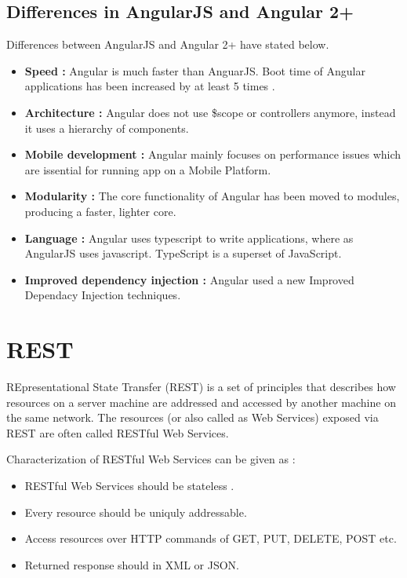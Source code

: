 \subsection{Differences in AngularJS and Angular 2+}
Differences between AngularJS and Angular  2+ have stated below.
 
\begin{itemize}
\item{\textbf{ Speed :}  Angular is much faster than AnguarJS. Boot time of Angular applications has been increased by at least 5 times \cite{faster}.}
\item{\textbf{ Architecture :} Angular does not use \$scope or controllers anymore, instead it uses a hierarchy of components. }
\item{\textbf{ Mobile development :} Angular mainly focuses on  performance issues which are issential for running app on a Mobile Platform. }
\item{\textbf{ Modularity :} The core functionality of Angular has been moved to modules, producing a faster, lighter core. }
\item{\textbf{ Language :} Angular uses typescript to write applications, where as AngularJS uses javascript. TypeScript is a superset of JavaScript.}
\item{\textbf{ Improved dependency injection :} Angular used a new Improved Dependacy Injection techniques. }
\end{itemize}



\section{REST}

\hspace*{0.2in}REpresentational State Transfer (REST) \cite{rest} is a set of principles that describes how resources on a server machine are addressed and accessed by  another machine on the same network. The resources (or also called as Web Services) exposed via REST are often called RESTful Web Services. 

Characterization of RESTful Web Services can be given as :
\begin{itemize}
\item{ RESTful Web Services should be stateless \cite{stateless}. }
\item{ Every resource should be uniquly addressable. }
\item{ Access resources over HTTP commands of GET, PUT, DELETE, POST etc. }
\item{ Returned response should in XML or JSON. }
\end{itemize}

